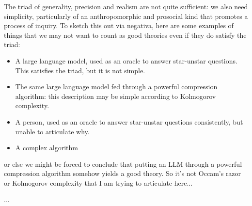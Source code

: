 
The triad of generality, precision and realism are not quite sufficient: we also need simplicity, particularly of an anthropomorphic and prosocial kind that promotes a process of inquiry. To sketch this out via negativa, here are some examples of things that we may not want to count as good theories even if they do satisfy the triad:

\begin{itemize}
\item{A large language model, used as an oracle to answer star-unstar questions. This satisfies the triad, but it is not simple.}
\item{The same large language model fed through a powerful compression algorithm: this description may be simple according to Kolmogorov complexity.}
\item{A person, used as an oracle to answer star-unstar questions consistently, but unable to articulate why.}
\item{A complex algorithm }
\end{itemize}

or else we might be forced to conclude that putting an LLM through a powerful compression algorithm somehow yields a good theory. So it's not Occam's razor or Kolmogorov complexity that I am trying to articulate here...


...


